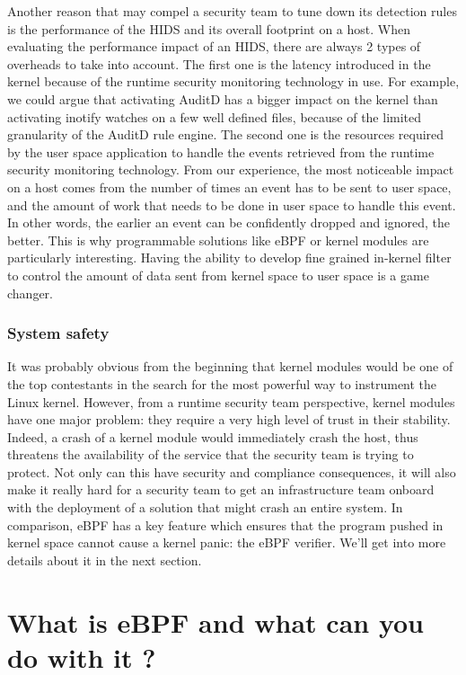 Another reason that may compel a security team to tune down its detection rules is the performance of the HIDS and its overall footprint on a host.
When evaluating the performance impact of an HIDS, there are always 2 types of overheads to take into account.
The first one is the latency introduced in the kernel because of the runtime security monitoring technology in use.
For example, we could argue that activating AuditD has a bigger impact on the kernel than activating inotify watches on a few well defined files, because of the limited granularity of the AuditD rule engine.
The second one is the resources required by the user space application to handle the events retrieved from the runtime security monitoring technology.
From our experience, the most noticeable impact on a host comes from the number of times an event has to be sent to user space, and the amount of work that needs to be done in user space to handle this event.
In other words, the earlier an event can be confidently dropped and ignored, the better.
This is why programmable solutions like eBPF or kernel modules are particularly interesting.
Having the ability to develop fine grained in-kernel filter to control the amount of data sent from kernel space to user space is a game changer.

\subsubsection{System safety}

It was probably obvious from the beginning that kernel modules would be one of the top contestants in the search for the most powerful way to instrument the Linux kernel.
However, from a runtime security team perspective, kernel modules have one major problem: they require a very high level of trust in their stability.
Indeed, a crash of a kernel module would immediately crash the host, thus threatens the availability of the service that the security team is trying to protect.
Not only can this have security and compliance consequences, it will also make it really hard for a security team to get an infrastructure team onboard with the deployment of a solution that might crash an entire system.
In comparison, eBPF has a key feature which ensures that the program pushed in kernel space cannot cause a kernel panic: the eBPF verifier.
We'll get into more details about it in the next section.

\section{What is eBPF and what can you do with it ?}
\label{section:RuntimeSecurityMonitoringWithEBPF:EBPF}

